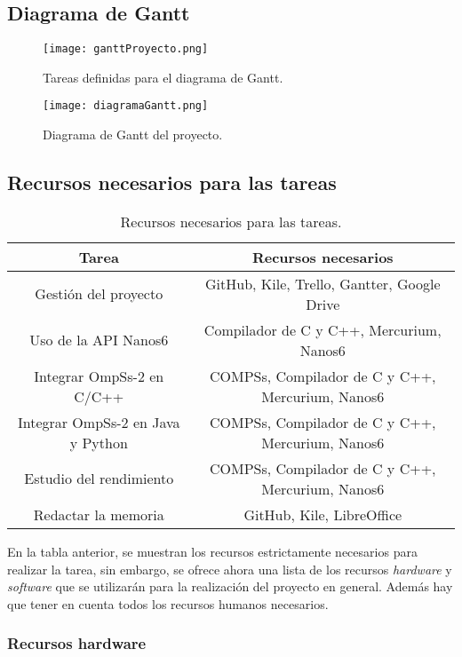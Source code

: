 \subsection{Diagrama de Gantt}

\begin{figure}[H]
    \centering 
    \caption{Tareas definidas para el diagrama de Gantt.}
    \texttt{[image: ganttProyecto.png]}
    \label{fig:gantt_tareas}
\end{figure}

\begin{figure}[H]
    \centering 
    \caption{Diagrama de Gantt del proyecto.}
    \texttt{[image: diagramaGantt.png]}
    \label{fig:diagrama_gantt}
\end{figure}

\subsection{Recursos necesarios para las tareas}

\begin{table}[H]
 \centering
 \begin{tabular}{|| c | c ||}
 \hline
 Tarea & Recursos necesarios \\
 \hline\hline  
 Gestión del proyecto & GitHub, Kile, Trello, Gantter, Google Drive \\
 \hline
 Uso de la API Nanos6 & Compilador de C y C++, Mercurium, Nanos6 \\
 \hline
 Integrar OmpSs-2 en C/C++ & COMPSs, Compilador de C y C++, Mercurium, Nanos6 \\
 \hline
 Integrar OmpSs-2 en Java y Python & COMPSs, Compilador de C y C++, Mercurium, Nanos6 \\
 \hline
 Estudio del rendimiento & COMPSs, Compilador de C y C++, Mercurium, Nanos6 \\
 \hline
 Redactar la memoria & GitHub, Kile, LibreOffice \\
 \hline
 \end{tabular}
 \caption{Recursos necesarios para las tareas.}
\end{table}

En la tabla anterior, se muestran los recursos estrictamente necesarios para realizar la tarea, sin embargo, se ofrece ahora una lista de los recursos \textit{hardware} y \textit{software} que se utilizarán para la realización del proyecto en general. Además hay que tener en cuenta todos los recursos humanos necesarios.

\subsubsection{Recursos hardware}


